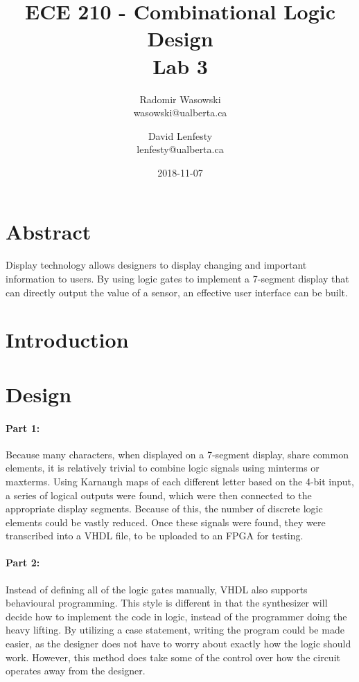 \documentclass{article}
\title{ECE 210 - Combinational Logic Design \\ Lab 3}
\date{2018-11-07}
\author{Radomir Wasowski \\ wasowski@ualberta.ca
        \and David Lenfesty \\ lenfesty@ualberta.ca}
\begin{document}
\doublespacing
\maketitle
\newpage

\singlespacing

\section{Abstract}

Display technology allows designers to display changing and important information to users.
By using logic gates to implement a 7-segment display that can directly output the value of a sensor,
an effective user interface can be built.

\section{Introduction}



\section{Design}

\paragraph{Part 1:}

Because many characters, when displayed on a 7-segment display, share common elements,
it is relatively trivial to combine logic signals using minterms or maxterms.
Using Karnaugh maps of each different letter based on the 4-bit input, a series of logical outputs
were found, which were then connected to the appropriate display segments.
Because of this, the number of discrete logic elements could be vastly reduced.
Once these signals were found, they were transcribed into a VHDL file,
to be uploaded to an FPGA for testing.

\paragraph{Part 2:}

Instead of defining all of the logic gates manually, VHDL also supports
behavioural programming.
This style is different in that the synthesizer will decide how to implement
the code in logic, instead of the programmer doing the heavy lifting.
By utilizing a case statement, writing the program could be made easier,
as the designer does not have to worry about exactly how the logic should work.
However, this method does take some of the control over how the circuit operates
away from the designer.
\end{document}
